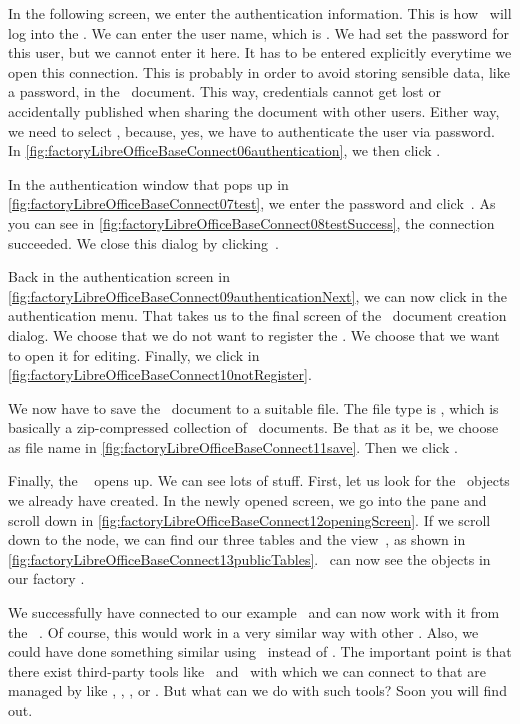 In the following screen, we enter the authentication information.
This is how \libreofficeBase\ will log into the \dbms.
We can enter the user name, which is .
We had set the password  for this user, but we cannot enter it here.
It has to be entered explicitly everytime we open this connection.
This is probably in order to avoid storing sensible data, like a password, in the \libreofficeBase\ document.
This way, credentials cannot get lost or accidentally published when sharing the document with other users.
Either way, we need to select , because, yes, we have to authenticate the user  via password.
In \cref{fig:factoryLibreOfficeBaseConnect06authentication}, we then click .

In the authentication window that pops up in \cref{fig:factoryLibreOfficeBaseConnect07test}, we enter the password  and click~.
As you can see in \cref{fig:factoryLibreOfficeBaseConnect08testSuccess}, the connection succeeded.
We close this dialog by clicking~.

Back in the authentication screen in \cref{fig:factoryLibreOfficeBaseConnect09authenticationNext}, we can now click  in the authentication menu.
That takes us to the final screen of the \db\ document creation dialog.
We choose that we do not want to register the \db.
We choose that we want to open it for editing.
Finally, we click  in \cref{fig:factoryLibreOfficeBaseConnect10notRegister}.

We now have to save the \libreofficeBase\ document to a suitable file.
The file type is , which is basically a zip-compressed collection of ~documents.
Be that as it be, we choose  as file name in \cref{fig:factoryLibreOfficeBaseConnect11save}.
Then we click .

Finally, the \db\  opens up.
We can see lots of stuff.
First, let us look for the \db\ objects we already have created.
In the newly opened screen, we go into the  pane and scroll down in \cref{fig:factoryLibreOfficeBaseConnect12openingScreen}.
If we scroll down to the  node, we can find our three tables and the view~, as shown in \cref{fig:factoryLibreOfficeBaseConnect13publicTables}.
\libreofficeBase\ can now see the objects in our factory \db.

We successfully have connected to our example \db\ and can now work with it from the \libreofficeBase\ .
Of course, this would work in a very similar way with other .
Also, we could have done something similar using \microsoftAccess\ instead of \libreofficeBase.
The important point is that there exist third-party tools like \microsoftAccess\ and \libreofficeBase\ with which we can connect to  that are managed by  like \postgresql, , \oracleDB, or \microsoftSqlServer.
But what can we do with such tools?
Soon you will find out.%
%
\FloatBarrier%
\endhsection%
%
